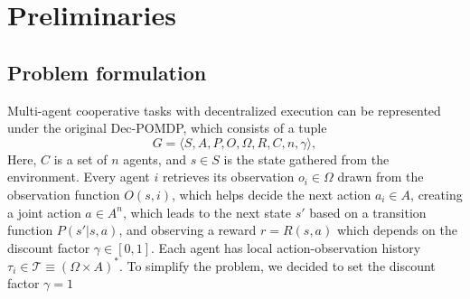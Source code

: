 \documentclass[sigconf]{aamas}
\begin{document}
\section{Preliminaries}
\subsection{Problem formulation}
Multi-agent cooperative tasks with decentralized execution can be represented under the original Dec-POMDP, which consists of a tuple \begin{equation}
G = \langle S, A, P, O, \Omega, R, C, n, \gamma \rangle,
\end{equation}
Here, \( C \) is a set of \( n \) agents, and \( s \in S \) is the state gathered from the environment. Every agent \( i \) retrieves its observation \( o_i \in \Omega \) drawn from the observation function \( O(s, i) \), which helps decide the next action \( a_i \in A \), creating a joint action \( a \in A^n \), which leads to the next state \( s' \) based on a transition function \( P(s'|s, a) \), and observing a reward \( r = R(s, a) \) which depends on the discount factor \( \gamma \in [0, 1] \). Each agent has local action-observation history \( \tau_i \in \mathcal{T} \equiv (\Omega \times A)^* \). To simplify the problem, we decided to set the discount factor  \( \gamma = 1 \)
\end{document}
